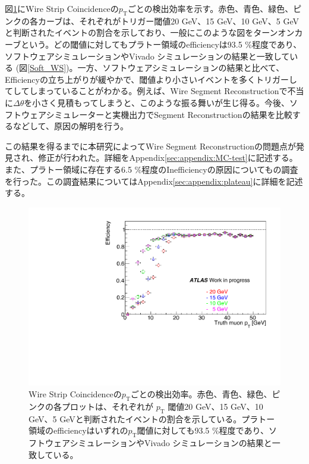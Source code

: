 図\ref{SM_A_WS_turnon}にWire Strip Coincidenceの$p_\mathrm{T}$ごとの検出効率を示す。赤色、青色、緑色、ピンクの各カーブは、それぞれがトリガー閾値20 GeV、15 GeV、10 GeV、5 GeVと判断されたイベントの割合を示しており、一般にこのような図をターンオンカーブという。どの\pt 閾値に対してもプラトー領域のefficiencyは93.5 \%程度であり、ソフトウェアシミュレーションやVivado シミュレーションの結果と一致している (図\ref{Soft_WS})。一方、ソフトウェアシミュレーションの結果と比べて、Efficiencyの立ち上がりが緩やかで、\pt 閾値より小さいイベントを多くトリガーしてしてしまっていることがわかる。例えば、Wire Segment Reconstructionで不当に$\Delta\theta$を小さく見積もってしまうと、このような振る舞いが生じ得る。今後、ソフトウェアシミュレーターと実機出力でSegment Reconstructionの結果を比較するなどして、原因の解明を行う。

この結果を得るまでに本研究によってWire Segment Reconstructionの問題点が発見され、修正が行われた。詳細をAppendix\ref{sec:appendix:MC-test}に記述する。また、プラトー領域に存在する6.5 \%程度のInefficiencyの原因についてもの調査を行った。この調査結果についてはAppendix\ref{sec:appendix:plateau}に詳細を記述する。

\begin{figure} 
\centering
\includegraphics[width=16cm]{fig/Test/A_SM_ws_turn.pdf}   
\caption[]{Wire Strip Coincidenceの$p_\mathrm{T}$ごとの検出効率。赤色、青色、緑色、ピンクの各プロットは、それぞれが $p_{\mathrm{T}}$ 閾値20 GeV、15 GeV、10 GeV、5 GeVと判断されたイベントの割合を示している。プラトー領域のefficiencyはいずれの$p_{\mathrm{T}}$閾値に対しても93.5 \%程度であり、ソフトウェアシミュレーションやVivado シミュレーションの結果と一致している。}
\label{SM_A_WS_turnon}
\end{figure}

